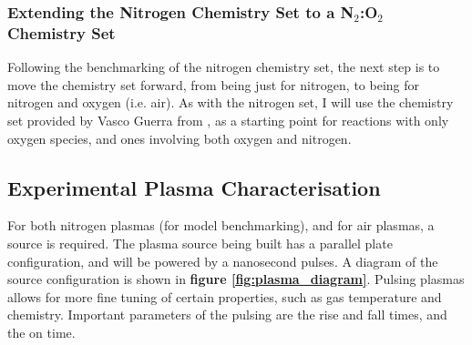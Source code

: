 \documentclass[11pt, oneside]{article}   	%
\begin{document}
\subsubsection{Extending the Nitrogen Chemistry Set to a N$_2$:O$_2$ Chemistry Set}

Following the benchmarking of the nitrogen chemistry set, the next step is to move the chemistry set forward, from being just for nitrogen, to being for nitrogen and oxygen (i.e. air).
As with the nitrogen set, I will use the chemistry set provided by Vasco Guerra from \cite{Kutasi2016tuning}, as a starting point for reactions with only oxygen species, and ones involving both oxygen and nitrogen.

\subsection{Experimental Plasma Characterisation}
\label{subsec:exp_characterisation}

For both nitrogen plasmas (for model benchmarking), and for air plasmas, a source is required.
The plasma source being built has a parallel plate configuration, and will be powered by a nanosecond pulses.
A diagram of the source configuration is shown in \textbf{figure \ref{fig:plasma_diagram}}.
Pulsing plasmas allows for more fine tuning of certain properties, such as gas temperature and chemistry.
Important parameters of the pulsing are the rise and fall times, and the on time.

\end{document}
